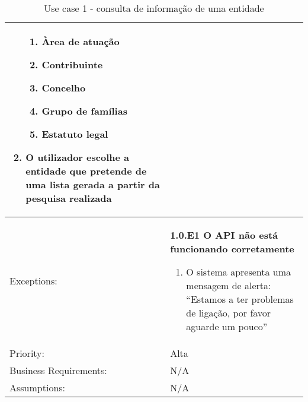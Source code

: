 \documentclass{scrreprt}
\begin{document}
\begin{table}[H]
\begin{adjustbox}{width=1.2\textwidth,center=\textwidth}
\begin{tabular}{|m{4cm}|m{12cm}|}
\begin{enumerate}
                \begin{enumerate}
                    \item Àrea de atuação
                    \item Contribuinte
                    \item Concelho
                    \item Grupo de famílias
                    \item Estatuto legal
                \end{enumerate}
                \item O utilizador escolhe a entidade que pretende de uma lista gerada a partir da pesquisa realizada
            \end{enumerate} \\
            \hline
            Exceptions: & \textbf{1.0.E1  O API não está funcionando corretamente}
            \begin{enumerate}
                \item O sistema apresenta uma mensagem de alerta: ``Estamos a ter problemas de ligação, por favor aguarde um pouco''
            \end{enumerate} \\
            \hline
            Priority: & Alta \\
            \hline
            Business Requirements: & N/A \\
            \hline
            Assumptions: & N/A \\
            \hline
        \end{tabular}
    \end{adjustbox}
    \caption{Use case 1 - consulta de informação de uma entidade}
    \label{use case 1}
\end{table}
\end{document}
